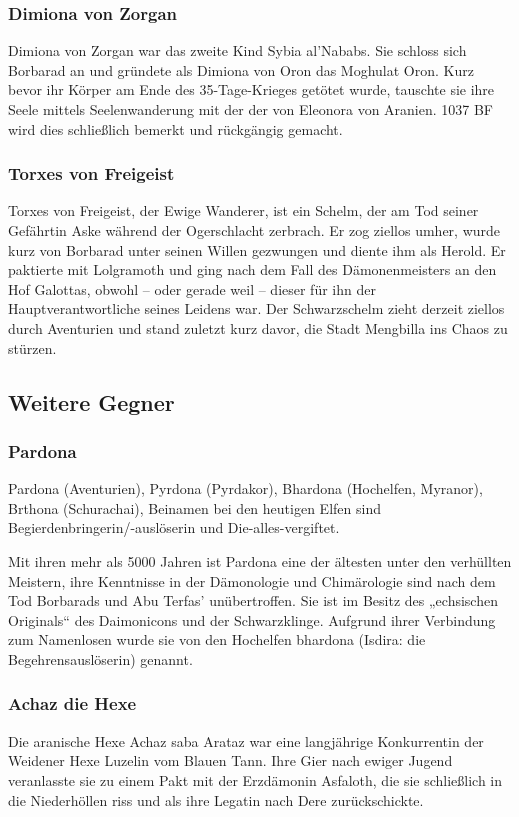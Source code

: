 \subsubsection{Dimiona von Zorgan}
Dimiona von Zorgan war das zweite Kind Sybia al'Nababs. Sie schloss sich Borbarad an und gründete als Dimiona von Oron das Moghulat Oron. Kurz bevor ihr Körper am Ende des 35-Tage-Krieges getötet wurde, tauschte sie ihre Seele mittels Seelenwanderung mit der der von Eleonora von Aranien. 1037 BF wird dies schließlich bemerkt und rückgängig gemacht. 

\subsubsection{Torxes von Freigeist}
Torxes von Freigeist, der Ewige Wanderer, ist ein Schelm, der am Tod seiner Gefährtin Aske während der Ogerschlacht zerbrach. Er zog ziellos umher, wurde kurz von Borbarad unter seinen Willen gezwungen und diente ihm als Herold. Er paktierte mit Lolgramoth und ging nach dem Fall des Dämonenmeisters an den Hof Galottas, obwohl – oder gerade weil – dieser für ihn der Hauptverantwortliche seines Leidens war. Der Schwarzschelm zieht derzeit ziellos durch Aventurien und stand zuletzt kurz davor, die Stadt Mengbilla ins Chaos zu stürzen. 

\subsection{Weitere Gegner}
\subsubsection{Pardona}
Pardona (Aventurien), Pyrdona (Pyrdakor), Bhardona (Hochelfen, Myranor), Brthona (Schurachai), Beinamen bei den heutigen Elfen sind Begierdenbringerin/-auslöserin und Die-alles-vergiftet.

Mit ihren mehr als 5000 Jahren ist Pardona eine der ältesten unter den verhüllten Meistern, ihre Kenntnisse in der Dämonologie und Chimärologie sind nach dem Tod Borbarads und Abu Terfas' unübertroffen. Sie ist im Besitz des „echsischen Originals“ des Daimonicons und der Schwarzklinge. Aufgrund ihrer Verbindung zum Namenlosen wurde sie von den Hochelfen bhardona (Isdira: die Begehrensauslöserin) genannt. 

\subsubsection{Achaz die Hexe}
Die aranische Hexe Achaz saba Arataz war eine langjährige Konkurrentin der Weidener Hexe Luzelin vom Blauen Tann. Ihre Gier nach ewiger Jugend veranlasste sie zu einem Pakt mit der Erzdämonin Asfaloth, die sie schließlich in die Niederhöllen riss und als ihre Legatin nach Dere zurückschickte.

